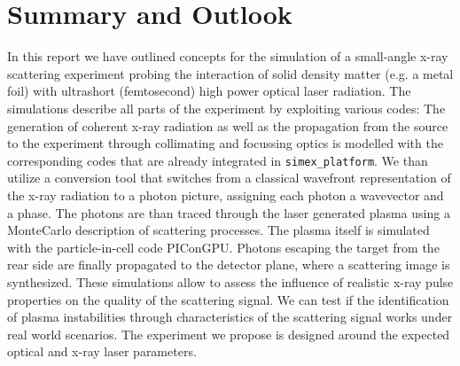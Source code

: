 \documentclass[12pt]{scrartcl}
\begin{document}
\section{Summary and Outlook}
In this report we have outlined concepts for the simulation of a small-angle
x-ray scattering experiment probing the interaction of solid density matter
(e.g. a metal foil) with ultrashort (femtosecond) high power optical laser
radiation. The simulations describe all parts of the experiment by exploiting
various codes: The generation of coherent x-ray radiation as well as the
propagation from the source to the experiment through collimating and focussing
optics is modelled with the corresponding codes that are already integrated in
\texttt{simex\_platform}. We than utilize a conversion tool that switches from a
classical wavefront representation of the x-ray radiation to a photon picture,
assigning each photon a wavevector and a phase. The photons are than traced
through the laser generated plasma using a MonteCarlo description of scattering
processes. The plasma itself
is simulated with the particle-in-cell code PIConGPU. Photons
escaping the target from the rear side are finally propagated to the detector
plane, where a scattering image is synthesized. These simulations allow to
assess the influence of realistic x-ray pulse properties on the quality of the
scattering signal. We can test if the identification of plasma
instabilities through characteristics of the scattering signal works under real
world scenarios.
The experiment we propose is designed around the expected optical and x-ray
laser parameters.
\end{document}
